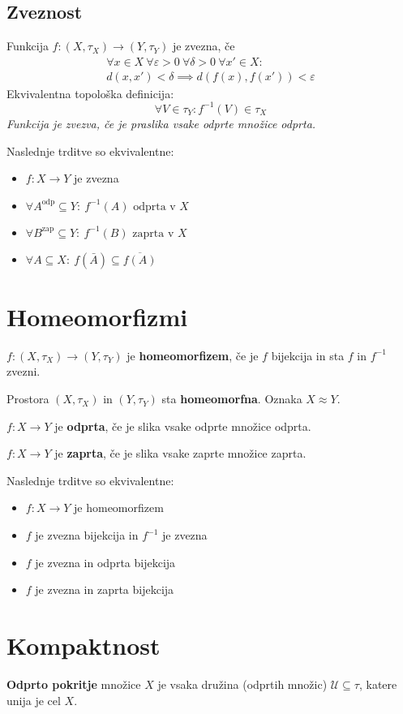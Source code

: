 \subsection*{Zveznost}
Funkcija $f: (X, \tau_X) \to (Y, \tau_Y)$ je zvezna, če
\begin{multline*}
	\forall x \in X\ \forall \varepsilon > 0\ \forall \delta > 0\ \forall x' \in X:\\ d(x,x') < \delta \implies d(f(x),f(x')) < \varepsilon
\end{multline*}
Ekvivalentna topološka definicija:
\[\forall V \in \tau_Y : f^{-1}(V) \in \tau_X\]
\emph{Funkcija je zvezva, če je praslika vsake odprte množice odprta.}

Naslednje trditve so ekvivalentne:
\begin{itemize}
	\item $f: X \to Y$ je zvezna
	\item $\forall A^{\text{odp}} \subseteq Y:\ f^{-1}(A) \text{ odprta v }X$
	\item $\forall B^{\text{zap}} \subseteq Y:\ f^{-1}(B) \text{ zaprta v }X$
	\item $\forall A \subseteq X:\ f(\bar{A}) \subseteq \overline{f(A)}$
\end{itemize}

\section*{Homeomorfizmi}
$f: (X, \tau_X) \to (Y, \tau_Y)$ je \textbf{homeomorfizem}, če je $f$ bijekcija in sta $f$ in $f^{-1}$ zvezni.

Prostora $(X, \tau_X)$ in $(Y, \tau_Y)$ sta \textbf{homeomorfna}. Oznaka $X \approx Y$.

$f: X \to Y$ je \textbf{odprta}, če je slika vsake odprte množice odprta. 

$f: X \to Y$ je \textbf{zaprta}, če je slika vsake zaprte množice zaprta. 

Naslednje trditve so ekvivalentne:
\begin{itemize}
	\item $f: X \to Y$ je homeomorfizem
	\item $f$ je zvezna bijekcija in $f^{-1}$ je zvezna
	\item $f$ je zvezna in odprta bijekcija
	\item $f$ je zvezna in zaprta bijekcija
\end{itemize}

\section*{Kompaktnost}
\textbf{Odprto pokritje} množice $X$ je vsaka družina (odprtih množic) $\mathcal{U} \subseteq \tau$, katere unija je cel $X$.

